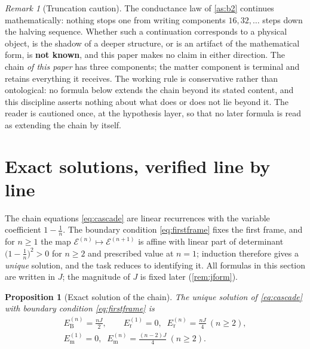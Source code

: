 \documentclass[11pt]{amsbook}
\theoremstyle{plain}
\newtheorem{proposition}[theorem]{Proposition}
\theoremstyle{definition}
\theoremstyle{remark}
\newtheorem{remark}[theorem]{Remark}
\newcommand{\uses}[1]{\par\nopagebreak\noindent{\footnotesize\emph{Uses: #1.}\par}}
\begin{document}
\begin{remark}[Truncation caution]\label{rem:truncation}
The conductance law of \cref{as:b2} continues mathematically: nothing stops one from writing components $16, 32, \ldots$ steps down the halving sequence. Whether such a continuation corresponds to a physical object, is the shadow of a deeper structure, or is an artifact of the mathematical form, is \textbf{not known}, and this paper makes no claim in either direction. The chain \emph{of this paper} has three components; the matter component is terminal and retains everything it receives. The working rule is conservative rather than ontological: no formula below extends the chain beyond its stated content, and this discipline asserts nothing about what does or does not lie beyond it. The reader is cautioned once, at the hypothesis layer, so that no later formula is read as extending the chain by itself.
\end{remark}

\section{Exact solutions, verified line by line}\label{sec:exact-solutions}

The chain equations \cref{eq:cascade} are linear recurrences with the variable coefficient $1 - \tfrac1n$. The boundary condition \cref{eq:firstframe} fixes the first frame, and for $n \geq 1$ the map $\boldsymbol{\mathcal{E}}^{(n)} \mapsto \boldsymbol{\mathcal{E}}^{(n+1)}$ is affine with linear part of determinant $\bigl(1-\tfrac1n\bigr)^{2} > 0$ for $n \geq 2$ and prescribed value at $n = 1$; induction therefore gives a \emph{unique} solution, and the task reduces to identifying it. All formulas in this section are written in $J$; the magnitude of $J$ is fixed later (\cref{rem:jform}).

\begin{proposition}[Exact solution of the chain]\label{prop:exact-solutions}
The unique solution of \cref{eq:cascade} with boundary condition \cref{eq:firstframe} is
\begin{equation}\label{eq:solutions}
\begin{gathered}
E_{\mathrm B}^{(n)} = \frac{nJ}{2},\qquad
E_{\mathrm r}^{(1)} = 0,\;\; E_{\mathrm r}^{(n)} = \frac{nJ}{4}\ (n \geq 2),\\
E_{\mathrm m}^{(1)} = 0,\;\; E_{\mathrm m}^{(n)} = \frac{(n-2)J}{4}\ (n \geq 2).
\end{gathered}
\end{equation}
\uses{\cref{eq:cascade}, \cref{eq:firstframe}}
\end{proposition}
\end{document}
